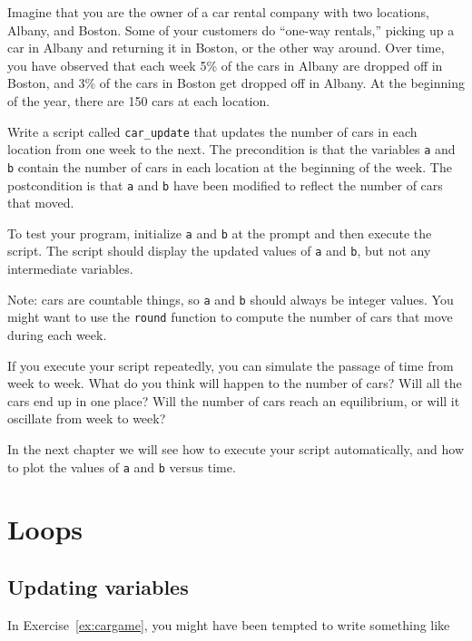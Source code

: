 \documentclass[
]{book}
\begin{document}
\begin{ex}
\label{ex:cargame}

Imagine that you are the owner of a car rental company with two
locations, Albany, and Boston.  Some of your customers do ``one-way
rentals,'' picking up a car in Albany and returning it in Boston, or
the other way around.  Over time, you have observed that each week 5\%
of the cars in Albany are dropped off in Boston, and 3\% of the cars
in Boston get dropped off in Albany.
At the beginning of the year, there are 150 cars at each location.

Write a script called {\tt car\_update} that updates the number
of cars in each location from one week to the next.  The precondition
is that the variables {\tt a} and {\tt b} contain the number of cars
in each location at the beginning of the week.  The postcondition
is that {\tt a} and {\tt b} have been modified to reflect the number
of cars that moved.

To test your program, initialize {\tt a} and {\tt b} at
the prompt and then execute the script.  The script should display
the updated values of {\tt a} and {\tt b}, but not any intermediate
variables.

Note: cars are countable things, so {\tt a} and {\tt b} should always
be integer values.  You might want to use the {\tt round} function
to compute the number of cars that move during each week.

If you execute your script repeatedly, you can simulate the passage
of time from week to week.  What do you think will happen to the
number of cars?  Will all the cars end up in one place?  Will the
number of cars reach an equilibrium, or will it oscillate from week
to week?

In the next chapter we will see how to execute your script automatically,
and how to plot the values of {\tt a} and {\tt b} versus time.
\end{ex}



\chapter{Loops}

\section{Updating variables}

In Exercise~\ref{ex:cargame}, you might have been tempted to write something
like
\end{document}
